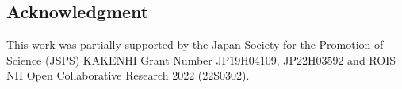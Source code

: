 \subsection*{Acknowledgment}
This work was partially supported by the Japan Society for the Promotion of
Science (JSPS) KAKENHI Grant Number JP19H04109, JP22H03592 and ROIS NII Open
Collaborative Research 2022 (22S0302).